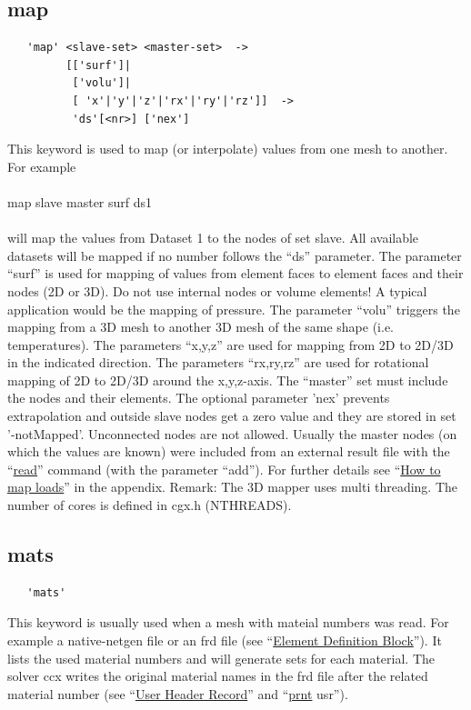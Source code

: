 \documentclass{article}
\providecommand{\htmlref}[2]{\hyperref[#2]{#1}}
\begin{document}
\subsection{\label{map}map}
\begin{verbatim}
   'map' <slave-set> <master-set>  ->
         [['surf']|
          ['volu']|
          [ 'x'|'y'|'z'|'rx'|'ry'|'rz']]  ->
          'ds'[<nr>] ['nex']
\end{verbatim}
This keyword is used to map (or interpolate) values from one mesh to another. For example\\\\map slave master surf ds1\\\\will map the values from Dataset 1 to the nodes of set slave. All available datasets will be mapped if no number follows the ``ds'' parameter. The parameter ``surf'' is used for mapping of values from element faces to element faces and their nodes (2D or 3D). Do not use internal nodes or volume elements! A typical application would be the mapping of pressure. The parameter ``volu'' triggers the mapping from a 3D mesh to another 3D mesh of the same shape (i.e. temperatures). The parameters ``x,y,z'' are used for mapping from 2D to 2D/3D in the indicated direction. The parameters ``rx,ry,rz'' are used for rotational mapping of 2D to 2D/3D around the x,y,z-axis. The ``master'' set must include the nodes and their elements. The optional parameter 'nex' prevents extrapolation and outside slave nodes get a zero value and they are stored in set '-notMapped'. Unconnected nodes are not allowed. Usually the master nodes (on which the values are known) were included from an external result file with the ``\htmlref{read}{read}'' command (with the parameter ``add''). For further details see ``\htmlref{How to map loads}{How to map loads}'' in the appendix. Remark: The 3D mapper uses multi threading. The number of cores is defined in cgx.h (NTHREADS).

\subsection{\label{mats}mats}
\begin{verbatim}
   'mats' 
\end{verbatim}
This keyword is usually used when a mesh with mateial numbers was read. For example a native-netgen file \cite{NETGEN} or an frd file (see ``\htmlref{Element Definition Block}{Element Definition Block}''). It lists the used material numbers and will generate sets for each material. The solver ccx writes the original material names in the frd file after the related material number (see ``\htmlref{User Header Record}{User Header Record}'' and ``\htmlref{prnt}{prnt} usr'').
\end{document}
